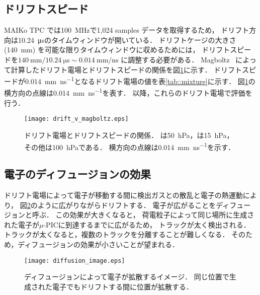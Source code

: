 \documentclass[../master]{subfiles}
\begin{document}
\subsection{ドリフトスピード}
MAIKo TPC では\SI{100}{\mega\hertz}で1,024 samples データを取得するため，
ドリフト方向は\SI{10.24}{\micro\second}のタイムウィンドウが開いている．
ドリフトケージの大きさ (\SI{140}{\milli\metre}) を可能な限りタイムウィンドウに収めるためには，
ドリフトスピードを$\SI{140}{\milli\metre}/\SI{10.24}{\micro\second} \sim \SI{0.014}{\milli\metre\per\nano\second}$
に調整する必要がある．
Magboltz~\cite{magboltz} によって計算したドリフト電場とドリフトスピードの関係を図\ref{fig::drift_v_magboltz}に示す．
ドリフトスピードが\SI{0.014}{\milli\metre\per\nano\second}となるドリフト電場の値を表\ref{tab::mixture}に示す．
図\ref{fig::drift_v_magboltz}の横方向の点線は\SI{0.014}{\milli\metre\per\nano\second}を表す．
以降，これらのドリフト電場で評価を行う．
\begin{figure}
  \centering
  \texttt{[image: drift\_v\_magboltz.eps]}
  \caption[ドリフト電場とドリフトスピードの関係．]
          {ドリフト電場とドリフトスピードの関係．
            \Methane は\SI{50}{\hecto\pascal}，\isoButane は\SI{15}{\hecto\pascal}，その他は\SI{100}{\hecto\pascal}である．
            横方向の点線は\SI{0.014}{\milli\metre\per\nano\second}を示す．}
          \label{fig::drift_v_magboltz}
\end{figure}

\subsection{電子のディフュージョンの効果}
ドリフト電場によって電子が移動する間に検出ガスとの散乱と電子の熱運動により，
図\ref{fig::diffusion-image}のように広がりながらドリフトする．
電子が広がることをディフュージョンと呼ぶ．
この効果が大きくなると，
荷電粒子によって同じ場所に生成された電子が$\mu$-PICに到達するまでに広がるため，
トラックが太く検出される．
トラックが太くなると，複数のトラックを分離することが難しくなる．
そのため，ディフュージョンの効果が小さいことが望まれる．
\begin{figure}
  \centering
  \texttt{[image: diffusion\_image.eps]}
  \caption[ディフュージョンによって電子が拡散するイメージ．]
          {ディフュージョンによって電子が拡散するイメージ．
          同じ位置で生成された電子でもドリフトする間に位置が拡散する．}
  \label{fig::diffusion-image}
\end{figure}
\end{document}
